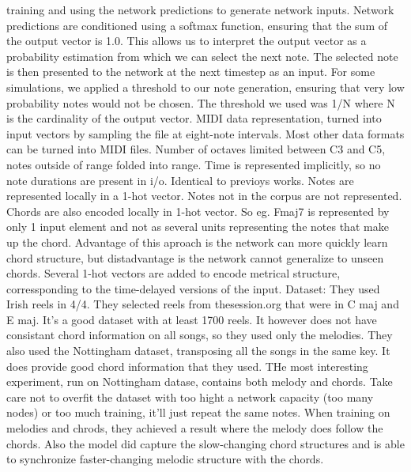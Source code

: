 training and using the network predictions to generate network inputs. Network predictions are conditioned using a softmax function, ensuring that the sum of the output vector is 1.0. This allows us to interpret the output vector as a probability estimation from which we can select the next note. The selected note is then presented to the network at the next timestep as an input. For some simulations, we applied a threshold to our note generation, ensuring that very low probability notes would not be chosen. The threshold we used was 1/N where N is the cardinality of the output vector. MIDI data representation, turned into input vectors by sampling the file at eight-note intervals. Most other data formats can be turned into MIDI files. Number of octaves limited between C3 and C5, notes outside of range folded into range. Time is represented implicitly, so no note durations are present in i/o. Identical to previoys works. Notes are represented locally in a 1-hot vector. Notes not in the corpus are not represented. Chords are also encoded locally in 1-hot vector. So eg. Fmaj7 is represented by only 1 input element and not as several units representing the notes that make up the chord. Advantage of this aproach is the network can more quickly learn chord structure, but distadvantage is the network cannot generalize to unseen chords. Several 1-hot vectors are added to encode metrical structure, corressponding to the time-delayed versions of the input. Dataset: They used Irish reels in 4/4. They selected reels from thesession.org that were in C maj and E maj. It's a good dataset with at least 1700 reels. It however does not have consistant chord information on all songs, so they used only the melodies. They also used the Nottingham dataset, transposing all the songs in the same key. It does provide good chord information that they used. THe most interesting experiment, run on Nottingham datase, contains both melody and chords. Take care not to overfit the dataset with too hight a network capacity (too many nodes) or too much training, it'll just repeat the same notes. When training on melodies and chrods, they achieved a result where the melody does follow the chords. Also the model did capture the slow-changing chord structures and is able to synchronize faster-changing melodic structure with the chords. 

